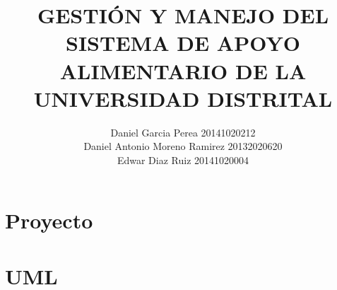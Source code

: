 \documentclass[11pt]{book}
\title{GESTIÓN Y MANEJO DEL SISTEMA DE APOYO ALIMENTARIO DE LA UNIVERSIDAD DISTRITAL}
\author{Daniel Garcia Perea 20141020212  \\ Daniel Antonio Moreno Ramirez 20132020620  \\ Edwar Diaz Ruiz 20141020004}
\begin{document}
	\maketitle
	\tableofcontents
\part{Proyecto}


\part{UML}


%
%
%
%


\end{document}
